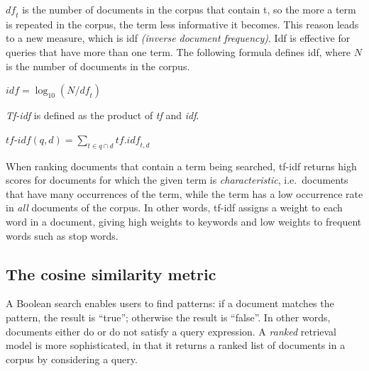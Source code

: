 \documentclass{IOS-Book-Article}
\begin{document}
$\mathit{df}_t$ is the number of documents in the corpus that contain t, so the more a term is repeated in the corpus, the term less informative it becomes.
This reason leads to a new measure, which is idf \emph{(inverse document frequency)}.
Idf is effective for queries that have more than one term.
The following formula defines idf, where $N$ is the number of documents in the corpus.

\begin{center} 
	$\mathit{idf}=\log_{10} (N/\mathit{df}_t)$
\end{center}

\emph{Tf-idf} is defined as the product of \emph{tf} and \emph{idf}. 

\begin{center}
	$\textit{tf-idf}(q,d)=\sum_{t\in q\cap d} \mathit{tf}.\mathit{idf}_{t,d}$
\end{center}

When ranking documents that contain a term being searched, tf-idf returns high scores for documents for which the given term is \emph{characteristic}, i.e.\ documents that have many occurrences of the term, while the term has a low occurrence rate in \emph{all} documents of the corpus.
In other words, tf-idf assigns a weight to each word in a document, giving high weights to keywords and low weights to frequent words such as stop words.

\subsection{The cosine similarity metric}
\label{sec:cosine}
A Boolean search enables users to find patterns: if a document matches the pattern, the result is “true”; otherwise the result is “false”.
In other words, documents either do or do not satisfy a query expression.
A \emph{ranked} retrieval model is more sophisticated, in that it returns a ranked list of documents in a corpus by considering a query. 
\end{document}
